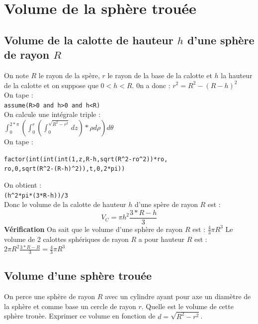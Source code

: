 \documentclass[a4paper,11pt]{book}
\begin{document}
\section{Volume de la sph\`ere trou\'ee}
\subsection{Volume de la calotte de hauteur $h$ d'une sph\`ere de rayon $R$}
On note $R$ le rayon de la sp\`ere, $r$ le rayon de la base de la calotte et 
$h$ la hauteur de la calotte et on suppose que $0<h<R$. 0n a donc :
$r^2=R^2-(R-h)^2$\\
On tape :\\
{\tt assume(R>0 and h>0 and h<R)}\\
On calcule une int\'egrale triple :\\
$\int_0^{2*\pi}(\int_0^r(\int_0^{\sqrt{R^2-r^2}}dz)*\rho d\rho)d\theta$\\
On tape :
\begin{center}{\tt factor(int(int(int(1,z,R-h,sqrt(R\verb|^|2-ro\verb|^|2))*ro,\\
                ro,0,sqrt(R\verb|^|2-(R-h)\verb|^|2)),t,0,2*pi))}\end{center}
On obtient :\\
{\tt (h\verb|^|2*pi*(3*R-h))/3}\\
Donc le volume de la calotte de hauteur $h$ d'une sp\`ere de rayon $R$ est :
$$V_C=\pi h^2\frac{3*R-h}{3}$$
{\bf V\'erification}
On sait que le volume d'une sph\`ere de rayon $R$ est : $\frac{4}{3}\pi R^3$
Le volume de 2 calottes sph\'eriques de rayon $R$ a pour hauteur $R$ est :\\
 $2\pi R^2\frac{3*R-R}{3}=\frac{4}{3}\pi R^3$
\subsection{Volume d'une sph\`ere trou\'ee}
On perce une sph\`ere de rayon $R$ avec un cylindre ayant pour axe un 
diam\`etre de la sph\`ere et comme base un cercle de rayon $r$. Quelle est le 
volume de cette sph\`ere trou\`ee. Exprimer ce volume  en fonction de  
$d=\sqrt{R^2-r^2}$.\\
\end{document}
